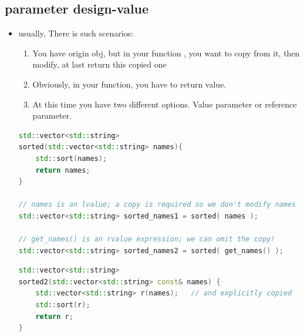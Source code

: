 \documentclass[a4paper,12pt,twoside]{book}
\begin{document}
\subsection{parameter design-value}
\begin{itemize}
\item usually, There is such scenarios:
\begin{enumerate}
\item You have origin obj, but in your function , you want to copy from it, then modify, at last return this copied one
\item Obviously, in your function, you have to return value.
\item At this time you have two different options. Value parameter or reference parameter.
\end{enumerate}

\begin{lstlisting}[frame=single, language=c++]
std::vector<std::string> 
sorted(std::vector<std::string> names){
    std::sort(names);
    return names;
}
 
// names is an lvalue; a copy is required so we don't modify names
std::vector<std::string> sorted_names1 = sorted( names );
 
// get_names() is an rvalue expression; we can omit the copy!
std::vector<std::string> sorted_names2 = sorted( get_names() );
\end{lstlisting}

\begin{lstlisting}[frame=single, language=c++]
std::vector<std::string> 
sorted2(std::vector<std::string> const& names) {
    std::vector<std::string> r(names);   // and explicitly copied
    std::sort(r);
    return r;
}
\end{lstlisting}


\end{itemize}
\end{document}
